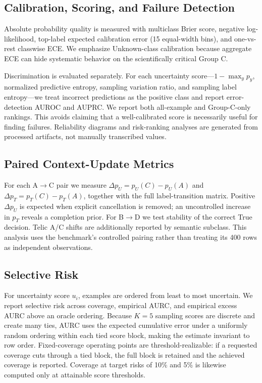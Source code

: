 \documentclass[letterpaper]{article}
\begin{document}
\subsection{Calibration, Scoring, and Failure Detection}
Absolute probability quality is measured with multiclass Brier score, negative log-likelihood, top-label expected calibration error (15 equal-width bins), and one-vs-rest classwise ECE. We emphasize Unknown-class calibration because aggregate ECE can hide systematic behavior on the scientifically critical Group C.

Discrimination is evaluated separately. For each uncertainty score---$1-\max_y p_y$, normalized predictive entropy, sampling variation ratio, and sampling label entropy---we treat incorrect predictions as the positive class and report error-detection AUROC and AUPRC. We report both all-example and Group-C-only rankings. This avoids claiming that a well-calibrated score is necessarily useful for finding failures. Reliability diagrams and risk-ranking analyses are generated from processed artifacts, not manually transcribed values.

\subsection{Paired Context-Update Metrics}
For each A$\rightarrow$C pair we measure $\Delta p_U=p_U(C)-p_U(A)$ and $\Delta p_T=p_T(C)-p_T(A)$, together with the full label-transition matrix. Positive $\Delta p_U$ is expected when explicit cancellation is removed; an uncontrolled increase in $p_T$ reveals a completion prior. For B$\rightarrow$D we test stability of the correct True decision. Telic A/C shifts are additionally reported by semantic subclass. This analysis uses the benchmark's controlled pairing rather than treating its 400 rows as independent observations.

\subsection{Selective Risk}
For uncertainty score $u_i$, examples are ordered from least to most uncertain. We report selective risk across coverage, empirical AURC, and empirical excess AURC above an oracle ordering. Because $K=5$ sampling scores are discrete and create many ties, AURC uses the expected cumulative error under a uniformly random ordering within each tied score block, making the estimate invariant to row order. Fixed-coverage operating points are threshold-realizable: if a requested coverage cuts through a tied block, the full block is retained and the achieved coverage is reported. Coverage at target risks of 10\% and 5\% is likewise computed only at attainable score thresholds.
\end{document}

